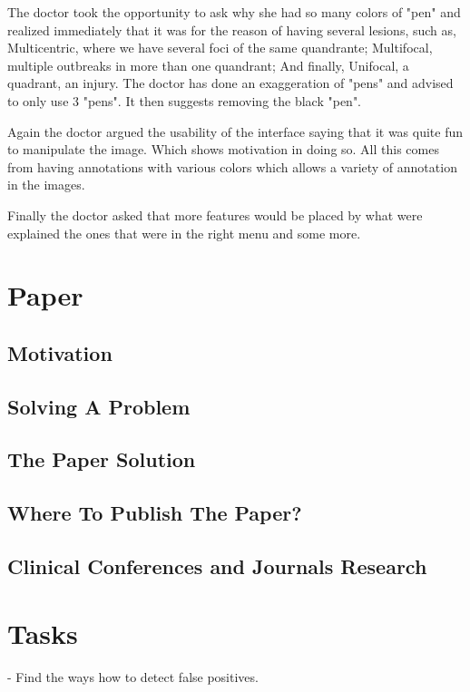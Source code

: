 The doctor took the opportunity to ask why she had so many colors of "pen" and realized immediately that it was for the reason of having several lesions, such as, Multicentric, where we have several foci of the same quandrante; Multifocal, multiple outbreaks in more than one quandrant; And finally, Unifocal, a quadrant, an injury. The doctor has done an exaggeration of "pens" and advised to only use 3 "pens". It then suggests removing the black "pen".

Again the doctor argued the usability of the interface saying that it was quite fun to manipulate the image. Which shows motivation in doing so.
All this comes from having annotations with various colors which allows a variety of annotation in the images.

Finally the doctor asked that more features would be placed by what were explained the ones that were in the right menu and some more.

\section{Paper}

\subsection{Motivation}

\subsection{Solving A Problem}

\subsection{The Paper Solution}

\subsection{Where To Publish The Paper?}

\subsection{Clinical Conferences and Journals Research}

\section{Tasks}

- Find the ways how to detect false positives.


